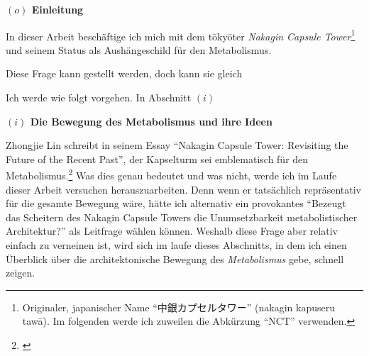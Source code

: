\documentclass[a4paper, 12pt]{article}
\begin{document}
\begin{onehalfspace} 

\noindent\textbf{$(o)$ Einleitung}

\noindent In dieser Arbeit beschäftige ich mich mit dem tōkyōter \emph{Nakagin Capsule Tower}\footnote{Originaler, japanischer Name "`中銀カプセルタワー"' (nakagin kapuseru tawā). Im folgenden werde ich zuweilen die Abkürzung "`NCT"' verwenden.} und seinem Status als Aushängeschild für den Metabolismus. 



Diese Frage kann gestellt werden, doch kann sie gleich 

\vspace{3mm}

Ich werde wie folgt vorgehen. In Abschnitt $(i)$ 

\vspace{5mm}
\noindent\textbf{$(i)$ Die Bewegung des Metabolismus und ihre Ideen} %

\noindent Zhongjie Lin schreibt in seinem Essay "`Nakagin Capsule Tower: Revisiting the Future of the Recent Past"', der Kapselturm sei emblematisch für den Metabolismus.\footnote{\Cite[Siehe][S. 243]{gleiter}} Was dies genau bedeutet und was nicht, werde ich im Laufe dieser Arbeit versuchen herauszuarbeiten. Denn wenn er tatsächlich repräsentativ für die gesamte Bewegung wäre, hätte ich alternativ ein provokantes "`Bezeugt das Scheitern des Nakagin Capsule Towers die Unumsetzbarkeit metabolistischer Architektur?"' als Leitfrage wählen können. Weshalb diese Frage aber relativ einfach zu verneinen ist, wird sich im laufe dieses Abschnitts, in dem ich einen Überblick über die architektonische Bewegung des \emph{Metabolismus} gebe, schnell zeigen.


\end{onehalfspace}
\end{document}
